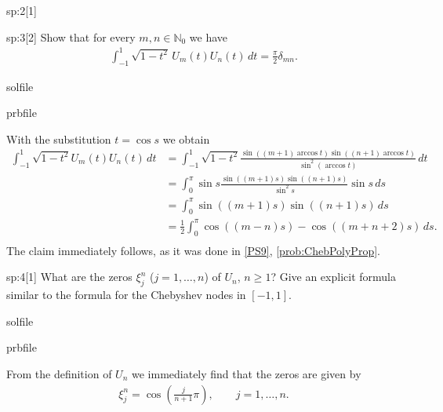 \begin{samproblem}
\begin{subproblem}{sp:2}[1]
\end{subproblem}

\begin{subproblem}{sp:3}[2]
  Show that for every $m,n\in\mathbb{N}_0$ we have
  \begin{align*}
    \int_{-1}^1 \sqrt{1-t^2}\,U_m(t) U_n(t)\,dt=\frac{\pi}{2}\delta_{mn}.
  \end{align*}

  \begin{samwriteprbpart}{solfile}
    \begin{writeverbatim}{prbfile}
      \begin{samsolution}
        With the substitution $t=\cos s$ we obtain
        \begin{align*}
          \int_{-1}^1 \sqrt{1-t^2}U_m(t) U_n(t)\,dt &= \int_{-1}^1 \sqrt{1-t^2}  \frac{\sin((m+1)\arccos t)\sin((n+1)\arccos t)}{\sin^2(\arccos t)}\,dt \\
            &=  \int_{0}^\pi \sin s  \frac{\sin((m+1)s)\sin((n+1)s)}{\sin^2 s}\sin s\,ds \\
            &=  \int_{0}^\pi  \sin((m+1)s)\sin((n+1)s)\,ds \\
            &=\frac{1}{2} \int_{0}^\pi  \cos((m-n)s) - \cos((m+n+2)s)\,ds. \\
        \end{align*}
        The claim immediately follows, as it was done in \ref{PS9}, \ref{prob:ChebPolyProp}.
     \end{samsolution}
    \end{writeverbatim}
  \end{samwriteprbpart}

\end{subproblem}

\begin{subproblem}{sp:4}[1]
  What are the zeros $\xi^n_j$ ($j=1,\dots,n$) of $U_n$, $n\ge 1$? Give an explicit formula similar to the formula for the Chebyshev nodes in $[-1,1]$.

  \begin{samwriteprbpart}{solfile}
    \begin{writeverbatim}{prbfile}
      \begin{samsolution}
        From the definition of $U_n$ we immediately find that the zeros are given by
        \begin{align}\label{eq:zeros}
          \xi^n_j= \cos\left(\frac{j}{n+1}\pi\right),\qquad j=1,\dots,n.
        \end{align}
     \end{samsolution}
    \end{writeverbatim}
  \end{samwriteprbpart}


\end{subproblem}
\end{samproblem}
